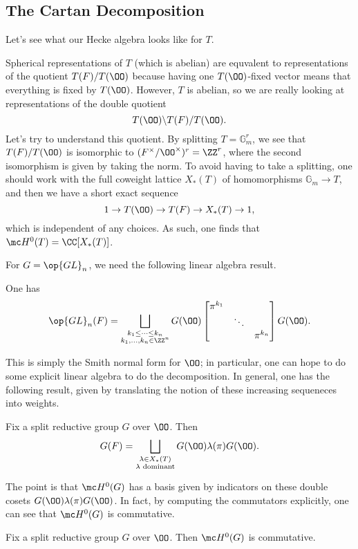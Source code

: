 \documentclass{article}
\begin{document}
\subsection{The Cartan Decomposition}
Let's see what our Hecke algebra looks like for $T$.
\begin{example}
	Spherical representations of $T$ (which is abelian) are equvalent to representations of the quotient $T(F)/T(\OO)$ because having one $T(\OO)$-fixed vector means that everything is fixed by $T(\OO)$. However, $T$ is abelian, so we are really looking at representations of the double quotient
	\[T(\OO)\backslash T(F)/T(\OO).\]
	Let's try to understand this quotient. By splitting $T=\mathbb G_m^r$, we see that $T(F)/T(\OO)$ is isomorphic to $(F^\times/\OO^\times)^r=\ZZ^r$, where the second isomorphism is given by taking the norm. To avoid having to take a splitting, one should work with the full coweight lattice $X_*(T)$ of homomorphisms $\mathbb G_m\to T$, and then we have a short exact sequence
	\[1\to T(\OO)\to T(F)\to X_*(T)\to1,\]
	which is independent of any choices. As such, one finds that $\mc H^0(T)=\CC[X_*(T)]$.
\end{example}
For $G=\op{GL}_n$, we need the following linear algebra result.
\begin{theorem}
	One has
	\[\op{GL}_n(F)=\bigsqcup_{\substack{k_1\le\cdots\le k_n\\k_1,\ldots,k_n\in\ZZ^n}}G(\OO)\begin{bmatrix}
		\pi^{k_1} \\ & \ddots \\ && \pi^{k_n}
	\end{bmatrix}G(\OO).\]
\end{theorem}
This is simply the Smith normal form for $\OO$; in particular, one can hope to do some explicit linear algebra to do the decomposition. In general, one has the following result, given by translating the notion of these increasing sequeneces into weights.
\begin{theorem}
	Fix a split reductive group $G$ over $\OO$. Then
	\[G(F)=\bigsqcup_{\substack{\lambda\in X_*(T)\\\lambda\text{ dominant}}}G(\OO)\lambda(\pi)G(\OO).\]
\end{theorem}
The point is that $\mc H^0(G)$ has a basis given by indicators on these double cosets $G(\OO)\lambda(\pi)G(\OO)$. In fact, by computing the commutators explicitly, one can see that $\mc H^0(G)$ is commutative.
\begin{corollary}
	Fix a split reductive group $G$ over $\OO$. Then $\mc H^0(G)$ is commutative.
\end{corollary}
\end{document}
